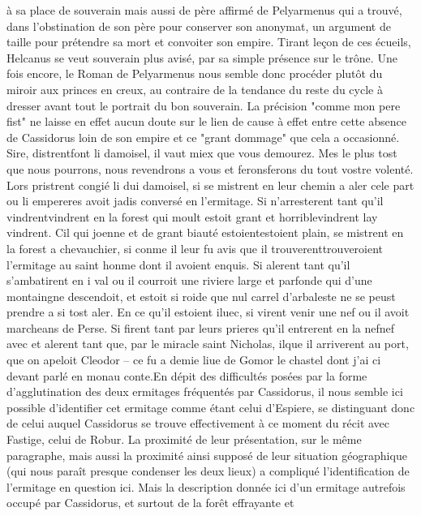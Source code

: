 \documentclass{article}
\begin{document}
\begin{pages}
   à sa place de souverain mais aussi de père affirmé de Pelyarmenus qui a trouvé, dans l'obstination de son père pour conserver 
   son anonymat, un argument de taille pour prétendre sa mort et convoiter son empire. Tirant leçon de ces écueils, Helcanus 
   se veut souverain plus avisé, par sa simple présence sur le trône. Une fois encore, le Roman de Pelyarmenus nous semble donc procéder
   plutôt du miroir aux princes en creux, au contraire de la tendance du reste du cycle à dresser avant tout le portrait du bon souverain.
   La précision "comme mon pere fist" ne laisse en effet aucun doute sur le lien de cause à effet entre cette absence de Cassidorus loin 
   de son empire et ce "grant dommage" que cela a occasionné.
   Sire, distrentfont li damoisel, 
      il vaut miex que vous demourez. Mes le plus tost que nous pourrons, 
      nous revendrons a vous et 
      feronsferons du tout vostre volenté. \pend
\pstart Lors pristrent congié 
   li dui damoisel, si se mistrent en leur chemin a aler cele part ou 
   li empereres avoit jadis conversé en l’ermitage. 
   Si n’arresterent tant qu’il vindrentvindrent en la forest qui moult estoit grant 
      et horriblevindrent lay vindrent. Cil qui joenne et de grant biauté 
   estoientestoient plain, se mistrent en 
   la forest a chevauchier, si conme il leur fu avis que il 
   trouverenttrouveroient 
   l’ermitage au 
   saint honme dont il avoient enquis. 
   Si alerent tant qu’il s’ambatirent en i val ou il courroit une riviere large et parfonde qui d’une montaingne descendoit, 
   et estoit si roide que nul carrel d’arbaleste ne se peust prendre a si tost aler. En ce qu’il estoient iluec, 
   si virent venir une nef ou il avoit marcheans de Perse. 
   Si firent tant par leurs prieres qu’il entrerent en la nefnef avec 
   et alerent tant que, par le miracle saint Nicholas, 
   ilque il arriverent au port, que on apeloit 
   Cleodor – ce fu a demie liue de Gomor le chastel 
   dont j’ai ci devant parlé 
      en monau conte.En dépit des difficultés posées par la forme d'agglutination des deux ermitages fréquentés par Cassidorus,
         il nous semble ici possible d'identifier cet ermitage comme étant celui d'Espiere, se distinguant donc de celui auquel 
         Cassidorus se trouve effectivement à ce moment du récit avec Fastige, celui de Robur. La proximité de leur présentation, 
         sur le même paragraphe, mais aussi la proximité ainsi supposé de leur situation géographique 
         (qui nous paraît presque condenser les deux lieux) a compliqué l'identification de l'ermitage en question ici.
         Mais la description donnée ici d'un ermitage autrefois occupé par Cassidorus, et surtout de la forêt effrayante et

\end{pages}
\end{document}
